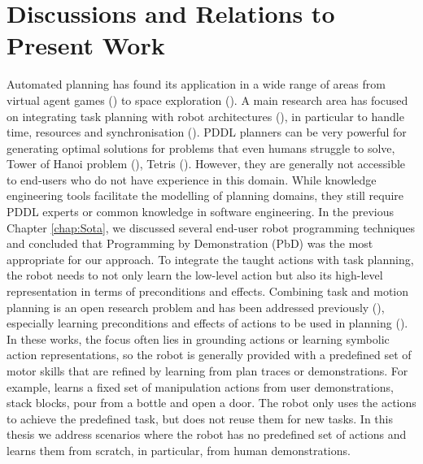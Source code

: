 \section{Discussions and Relations to Present Work}\label{subsec:APdiscussions}
Automated planning has found its application in a wide range of areas from virtual agent games (\cite{fernandez2006planning}) to space exploration (\cite{backes2004multi,bresina2005activity}).
A main research area has focused on integrating task planning with robot architectures (\cite{cashmore2015rosplan}), in particular to handle time, resources and synchronisation (\cite{di2014planner,dvorak2014flexible}).
PDDL planners can be very powerful for generating optimal solutions for problems that even humans struggle to solve, \eg Tower of Hanoi problem (\cite{hanoiPddlGit}), Tetris (\cite{ipc14site}).
However, they are generally not accessible to end-users who do not have experience in this domain. 
While knowledge engineering tools facilitate the modelling of planning domains, they still require PDDL experts or common knowledge in software engineering.
In the previous Chapter \ref{chap:Sota}, we discussed several end-user robot programming techniques and concluded that Programming by Demonstration (PbD) was the most appropriate for our approach.
To integrate the taught actions with task planning, the robot needs to not only learn the low-level action but also its high-level representation in terms of preconditions and effects.
Combining task and motion planning is an open research problem and has been addressed previously (\cite{ferrer2015planning,garrett2015ffrob}), especially learning preconditions and effects of actions to be used in planning (\cite{jetchev2013learning,ahmadzadeh2015learning,ugur2015bottom,konidaris2018fromSkills}).
In these works, the focus often lies in grounding actions or learning symbolic action representations, so the robot is generally provided with a predefined set of motor skills that are refined by learning from plan traces or demonstrations.
For example, \citet{abdo2013learning} learns a fixed set of manipulation actions from user demonstrations, \ie stack blocks, pour from a bottle and open a door.
The robot only uses the actions to achieve the predefined task, but does not reuse them for new tasks.
In this thesis we address scenarios where the robot has no predefined set of actions and learns them from scratch, in particular, from human demonstrations.

